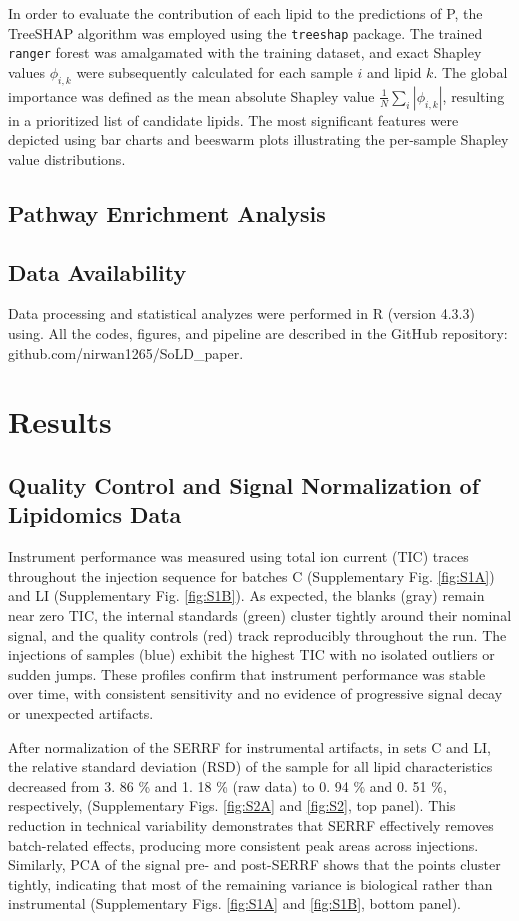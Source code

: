 \documentclass[10pt,letterpaper]{article}
\begin{document}
In order to evaluate the contribution of each lipid to the predictions of P, the TreeSHAP algorithm was employed using the \texttt{treeshap} package. The trained \texttt{ranger} forest was amalgamated with the training dataset, and exact Shapley values $\phi_{i,k}$ were subsequently calculated for each sample $i$ and lipid $k$. The global importance was defined as the mean absolute Shapley value $\frac{1}{N}\sum_i|\phi_{i,k}|$, resulting in a prioritized list of candidate lipids. The most significant features were depicted using bar charts and beeswarm plots illustrating the per-sample Shapley value distributions.

\subsection*{Pathway Enrichment Analysis}

\subsection*{Data Availability}
Data processing and statistical analyzes were performed in R (version 4.3.3) using. All the codes, figures, and pipeline are described in the GitHub repository: github.com/nirwan1265/SoLD\_paper.

\section*{Results}

\subsection*{Quality Control and Signal Normalization of Lipidomics Data}
Instrument performance was measured using total ion current (TIC) traces throughout the injection sequence for batches C (Supplementary Fig. \ref{fig:S1A}) and LI (Supplementary Fig. \ref{fig:S1B}). As expected, the blanks (gray) remain near zero TIC, the internal standards (green) cluster tightly around their nominal signal, and the quality controls (red) track reproducibly throughout the run. The injections of samples (blue) exhibit the highest TIC with no isolated outliers or sudden jumps. These profiles confirm that instrument performance was stable over time, with consistent sensitivity and no evidence of progressive signal decay or unexpected artifacts.

After normalization of the SERRF for instrumental artifacts, in sets C and LI, the relative standard deviation (RSD) of the sample  for all lipid characteristics decreased from 3. 86 \% and 1. 18 \% (raw data)  to 0. 94 \% and 0. 51 \%, respectively,  (Supplementary Figs. \ref{fig:S2A} and \ref{fig:S2}, top panel). This reduction in technical variability demonstrates that SERRF effectively removes batch-related effects, producing more consistent peak areas across injections. Similarly, PCA of the signal pre- and post-SERRF shows that the points cluster tightly, indicating that most of the remaining variance is biological rather than instrumental (Supplementary Figs. \ref{fig:S1A} and \ref{fig:S1B}, bottom panel).
\end{document}
